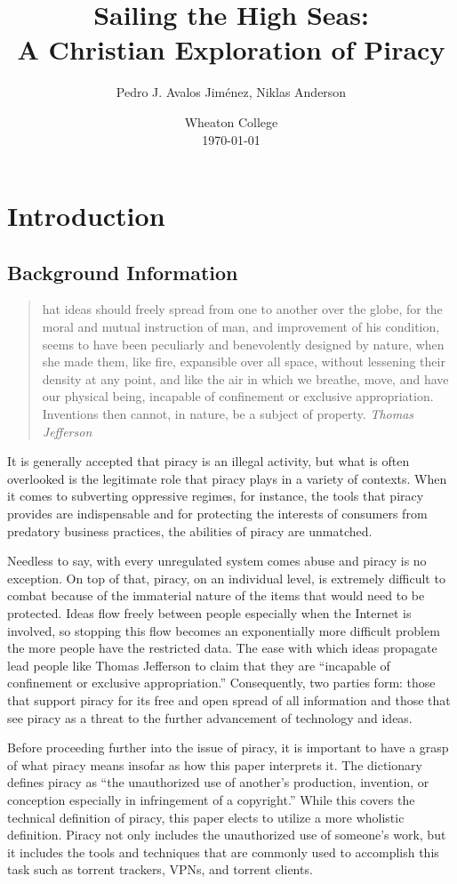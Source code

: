 \documentclass[onecolumn, 12pt]{article}
\title{Sailing the High Seas:\\ A Christian Exploration of Piracy}
\author{Pedro J. Avalos Jim\'enez, Niklas Anderson}
\date{Wheaton College\\\today}
\begin{document}
\maketitle

\section{Introduction}

\subsection{Background Information}

\blockcquote{barlow:wine}{%
  hat ideas should freely spread from one to another over the globe,
  for the moral and mutual instruction of man, and improvement of his
  condition, seems to have been peculiarly and benevolently designed by nature,
  when she made them, like fire, expansible over all space, without lessening
  their density at any point, and like the air in which we breathe, move, and
  have our physical being, incapable of confinement or exclusive appropriation.
  Inventions then cannot, in nature, be a subject of property.
  \emph{Thomas Jefferson}%
}

It is generally accepted that piracy is an illegal activity, but what is often overlooked
is the legitimate role that piracy plays in a variety of contexts. When it comes to
subverting oppressive regimes, for instance, the tools that piracy provides are
indispensable and for protecting the interests of consumers from predatory business
practices, the abilities of piracy are unmatched. 

Needless to say, with every unregulated system comes abuse and piracy is no exception.
On top of that, piracy, on an individual level, is extremely difficult to combat because
of the immaterial nature of the items that would need to be protected. Ideas flow freely
between people especially when the Internet is involved, so stopping this flow becomes an
exponentially more difficult problem the more people have the restricted data. The ease
with which ideas propagate lead people like Thomas Jefferson to claim that they are
``incapable of confinement or exclusive appropriation.'' Consequently, two parties form:
those that support piracy for its free and open spread of all information and those that
see piracy as a threat to the further advancement of technology and ideas.

Before proceeding further into the issue of piracy, it is important to have a grasp of
what piracy means insofar as how this paper interprets it. The dictionary defines piracy
as ``the unauthorized use of another's production, invention, or conception especially in
infringement of a copyright.'' While this covers the technical definition of piracy, this
paper elects to utilize a more wholistic definition. Piracy not only includes the
unauthorized use of someone's work, but it includes the tools and techniques that are
commonly used to accomplish this task such as torrent trackers, VPNs, and torrent clients.
\end{document}
